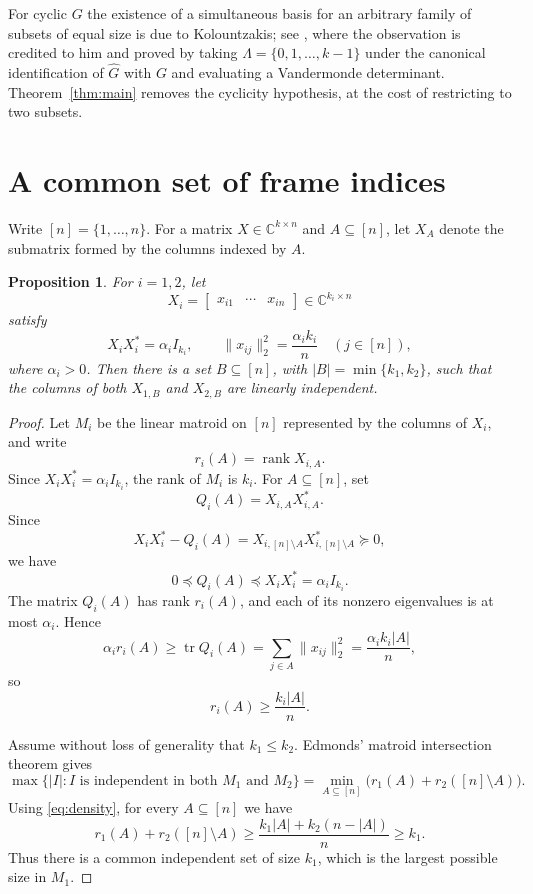 \documentclass[11pt]{amsart}
\newtheorem{proposition}[theorem]{Proposition}
\theoremstyle{remark}
\newcommand{\C}{\mathbb{C}}
\newcommand{\rank}{\operatorname{rank}}
\newcommand{\tr}{\operatorname{tr}}
\begin{document}
For cyclic $G$ the existence of a simultaneous basis for an arbitrary
family of subsets of equal size is due to Kolountzakis; see
\cite[Prop.~7.3]{FMS}, where the observation is credited to him and
proved by taking $\Lambda=\{0,1,\ldots,k-1\}$ under the canonical
identification of $\widehat G$ with $G$ and evaluating a Vandermonde
determinant. Theorem~\ref{thm:main} removes the cyclicity hypothesis,
at the cost of restricting to two subsets.

\section{A common set of frame indices}

Write $[n]=\{1,\ldots,n\}$. For a matrix
$X\in\C^{k\times n}$ and $A\subseteq[n]$, let $X_A$ denote the
submatrix formed by the columns indexed by $A$.

\begin{proposition}\label{prop:frames}
For $i=1,2$, let
\[
  X_i=
  \begin{bmatrix}
    x_{i1}&\cdots&x_{in}
  \end{bmatrix}
  \in\C^{k_i\times n}
\]
satisfy
\[
  X_iX_i^*=\alpha_i I_{k_i},
  \qquad
  \|x_{ij}\|_2^2=\frac{\alpha_i k_i}{n}
  \quad (j\in[n]),
\]
where $\alpha_i>0$. Then there is a set $B\subseteq[n]$, with
$|B|=\min\{k_1,k_2\}$, such that the columns of both $X_{1,B}$ and
$X_{2,B}$ are linearly independent.
\end{proposition}

\begin{proof}
Let $M_i$ be the linear matroid on $[n]$ represented by the columns
of $X_i$, and write
\[
  r_i(A)=\rank X_{i,A}.
\]
Since $X_iX_i^*=\alpha_i I_{k_i}$, the rank of $M_i$ is $k_i$.
For $A\subseteq[n]$, set
\[
  Q_i(A)=X_{i,A}X_{i,A}^*.
\]
Since
\[
  X_iX_i^*-Q_i(A)
  =X_{i,[n]\setminus A}X_{i,[n]\setminus A}^*\succeq0,
\]
we have
\[
  0\preceq Q_i(A)\preceq X_iX_i^*=\alpha_i I_{k_i}.
\]
The matrix $Q_i(A)$ has rank $r_i(A)$, and each of its nonzero
eigenvalues is at most $\alpha_i$. Hence
\[
  \alpha_i r_i(A)
  \geq \tr Q_i(A)
  =\sum_{j\in A}\|x_{ij}\|_2^2
  =\frac{\alpha_i k_i|A|}{n},
\]
so
\begin{equation}\label{eq:density}
  r_i(A)\geq\frac{k_i|A|}{n}.
\end{equation}

Assume without loss of generality that $k_1\leq k_2$. Edmonds'
matroid intersection theorem \cite{Edmonds} gives
\[
  \max\bigl\{|I|: I\text{ is independent in both }M_1\text{ and }M_2\bigr\}
  =
  \min_{A\subseteq[n]}
  \bigl(r_1(A)+r_2([n]\setminus A)\bigr).
\]
Using \eqref{eq:density}, for every $A\subseteq[n]$ we have
\[
  r_1(A)+r_2([n]\setminus A)
  \geq
  \frac{k_1|A|+k_2(n-|A|)}{n}
  \geq k_1.
\]
Thus there is a common independent set of size $k_1$, which is the
largest possible size in $M_1$.
\end{proof}
\end{document}
